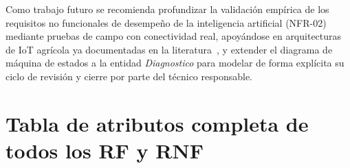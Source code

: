 \documentclass[11pt,a4paper]{report}
\begin{document}
Como trabajo futuro se recomienda profundizar la validación empírica de los requisitos no funcionales
de desempeño de la inteligencia artificial (NFR-02) mediante pruebas de campo con conectividad real,
apoyándose en arquitecturas de IoT agrícola ya documentadas en la literatura~\cite{chamara2022}, y
extender el diagrama de máquina de estados a la entidad \textit{Diagnostico} para modelar de forma
explícita su ciclo de revisión y cierre por parte del técnico responsable.

\clearpage



\appendix
\chapter{Tabla de atributos completa de todos los RF y RNF}
\end{document}
